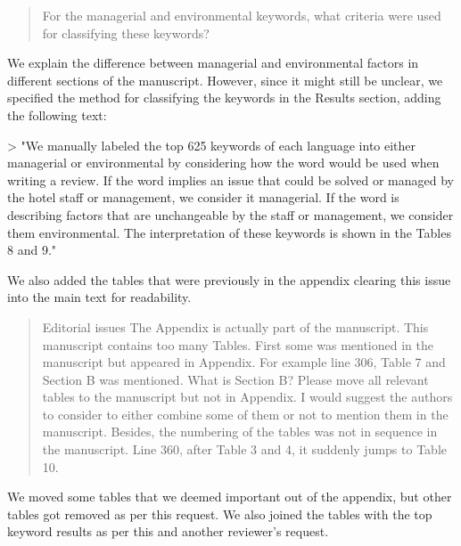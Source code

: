 \documentclass{letter}
\begin{document}
\begin{quotation}
For the managerial and environmental keywords, what criteria were used for classifying these keywords? 
\end{quotation}

We explain the difference between managerial and environmental factors in different sections of the manuscript. However, since it might still be unclear, we specified the method for classifying the keywords in the Results section, adding the following text:

> "We manually labeled the top
625 keywords of each language into either managerial or environmental by considering how the word would be used when writing a review. If the word implies an issue that could be solved or managed by the hotel staff or management, we consider it managerial. If the word is describing factors that are unchangeable by the staff or management, we consider them environmental. The interpretation of these keywords is shown in the Tables 8 and 9."

We also added the tables that were previously in the appendix clearing this issue into the main text for readability.

\begin{quotation}
Editorial issues
The Appendix is actually part of the manuscript. This manuscript contains too many Tables. First some was mentioned in the manuscript but appeared in Appendix. For example line 306, Table 7 and Section B was mentioned. What is Section B?  Please move all relevant tables to the manuscript but not in Appendix. I would suggest the authors to consider to either combine some of them or not to mention them in the manuscript. 
Besides, the numbering of the tables was not in sequence in the manuscript. Line 360, after Table 3 and 4, it suddenly jumps to Table 10.
\end{quotation}

We moved some tables that we deemed important out of the appendix, but other tables got removed as per this request. We also joined the tables with the top keyword results as per this and another reviewer's request.
\end{document}
